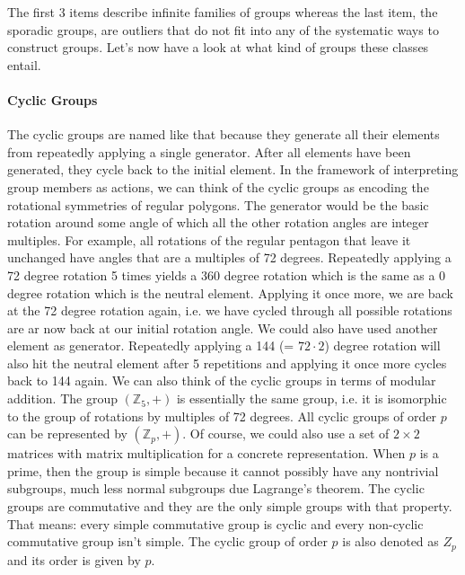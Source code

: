 The first 3 items describe infinite families of groups whereas the last item, the sporadic groups, are outliers that do not fit into any of the systematic ways to construct groups. Let's now have a look at what kind of groups these classes entail.

\paragraph{Cyclic Groups}
The cyclic groups are named like that because they generate all their elements from repeatedly applying a single generator. After all elements have been generated, they cycle back to the initial element. In the framework of interpreting group members as actions, we can think of the cyclic groups as encoding the rotational symmetries of regular polygons. The generator would be the basic rotation around some angle of which all the other rotation angles are integer multiples. For example, all rotations of the regular pentagon that leave it unchanged have angles that are a multiples of 72 degrees. Repeatedly applying a 72 degree rotation 5 times yields a 360 degree rotation which is the same as a 0 degree rotation which is the neutral element. Applying it once more, we are back at the  72 degree rotation again, i.e. we have cycled through all possible rotations are ar now back at our initial rotation angle. We could also have used another element as generator. Repeatedly applying a 144 (= $72 \cdot 2$) degree rotation will also hit the neutral element after 5 repetitions and applying it once more cycles back to 144 again. We can also think of the cyclic groups in terms of modular addition. The group $(\mathbb{Z}_5, +)$ is essentially the same group, i.e. it is isomorphic to the group of rotations by multiples of 72 degrees. All cyclic groups of order $p$ can be represented by $(\mathbb{Z}_p, +)$. Of course, we could also use a set of $2 \times 2$ matrices with matrix multiplication for a concrete representation. When $p$ is a prime, then the group is simple because it cannot possibly have any nontrivial subgroups, much less normal subgroups due Lagrange's theorem. The cyclic groups are commutative and they are the only simple groups with that property. That means: every simple commutative group is cyclic and every non-cyclic commutative group isn't simple. The cyclic group of order $p$ is also denoted as $Z_p$ and its order is given by $p$.


